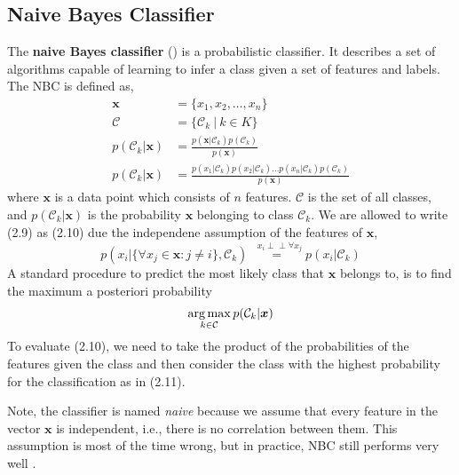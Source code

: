 \subsection{Naive Bayes Classifier}\label{section:nbc}
  The \textbf{naive Bayes classifier} () is a probabilistic classifier.
  It describes a set of algorithms capable of learning to infer a class given a set of features and labels.
  The NBC is defined as,
  \begin{align}
    \boldsymbol{x} &= \{x_1, x_2, \dots, x_n\} \\
    \mathcal{C} &= \{\mathcal{C}_k \: | \: k \in K \} \\
    p(\mathcal{C}_k|\boldsymbol{x}) &= \frac{p(\boldsymbol{x} |\mathcal{C}_k) p(\mathcal{C}_k)} {p(\boldsymbol{x})} \\
    p(\mathcal{C}_k|\boldsymbol{x}) &= \frac{p(x_1 |\mathcal{C}_k)
                                         p(x_2 |\mathcal{C}_k) \dots
                                         p(x_n |\mathcal{C}_k)
                                         p(\mathcal{C}_k)}{p(\boldsymbol{x})}
  \end{align}
  where $\boldsymbol{x}$ is a data point which consists of $n$ features.
  $\mathcal{C}$ is the set of all classes, and $p(\mathcal{C}_k|\boldsymbol{x})$ is the probability $\boldsymbol{x}$ belonging to class $\mathcal{C}_k$.
  We are allowed to write (2.9) as (2.10) due the independene assumption of the features of $\boldsymbol{x}$,
   \[p(x_i| \{\forall x_j \in \boldsymbol{x} : j \neq i \}, \mathcal{C}_k) \overset{\, \,\,\,x_i\perp\!\!\!\perp \forall x_j}{=} p(x_i|\mathcal{C}_k)\]
  A standard procedure to predict the most likely class that $\boldsymbol{x}$ belongs to, is to find the maximum a posteriori probability
  \begin{gather}
    \operatorname*{arg\,max}_{k \in \mathcal{C}} p(\mathcal{C}_k|\boldsymbol{x})
  \end{gather}
  To evaluate (2.10), we need to take the product of the probabilities of the features given the class and then consider the class with the highest probability for the classification as in (2.11).

  Note, the classifier is named \emph{naive} because we assume that every feature in the vector $\boldsymbol{x}$ is independent, i.e., there is no correlation between them.
  This assumption is most of the time wrong, but in practice, NBC still performs very well \citep{Rish2001}.


